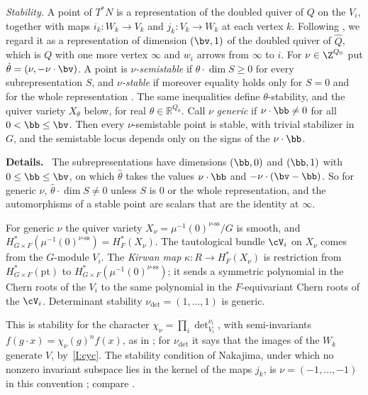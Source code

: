 \documentclass[11pt]{amsart}
\newenvironment{details}{\par\color{black!60!green}\noindent\textbf{Details.}\ }{\par}
\begin{document}
\emph{Stability.}  A point of $T^*N$ is a representation of the doubled
quiver of $Q$ on the $V_i$, together with maps $i_k\colon W_k\to V_k$ and
$j_k\colon V_k\to W_k$ at each vertex $k$.  Following \cite[\S1]{crawley-boeveyGeometryMoment2001}, we regard it as a
representation of dimension $(\bv,1)$ of the doubled quiver of $\hat Q$,
which is $Q$ with one more vertex $\infty$ and $w_i$ arrows from $\infty$ to
$i$.  For $\nu\in\Z^{Q_0}$ put $\hat\theta=(\nu,-\nu\cdot\bv)$.  A point is
\emph{$\nu$-semistable} if $\hat\theta\cdot\dim S\ge0$ for every
subrepresentation $S$, and \emph{$\nu$-stable} if moreover equality holds
only for $S=0$ and for the whole representation \cite{kingModuliRepresentations1994}.  The same
inequalities define $\theta$-stability, and the quiver variety $X_\theta$
below, for real $\theta\in\mathbb R^{Q_0}$.  Call $\nu$ \emph{generic} if
$\nu\cdot\bb\neq0$ for all $0<\bb\le\bv$.  Then every $\nu$-semistable point is
stable, with trivial stabilizer in $G$, and the semistable locus depends only
on the signs of the $\nu\cdot\bb$.
\begin{details}
The subrepresentations have dimensions $(\bb,0)$ and $(\bb,1)$ with
$0\le\bb\le\bv$, on which $\hat\theta$ takes the values $\nu\cdot\bb$ and
$-\nu\cdot(\bv-\bb)$.  So for generic $\nu$, $\hat\theta\cdot\dim S\neq0$ unless
$S$ is $0$ or the whole representation, and the automorphisms of a stable
point are scalars that are the identity at $\infty$.
\end{details}
For generic $\nu$ the quiver variety
$X_\nu=\mu^{-1}(0)^{\nu\text{-ss}}/G$ is smooth, and
$H^*_{G\times F}(\mu^{-1}(0)^{\nu\text{-ss}})=H^*_F(X_\nu)$.  The
tautological bundle $\cV_i$ on $X_\nu$ comes from the $G$-module $V_i$.  The
\emph{Kirwan map} $\kappa\colon R\to H^*_F(X_\nu)$ is restriction from
$H^*_{G\times F}(\mathrm{pt})$ to $H^*_{G\times F}(\mu^{-1}(0)^{\nu\text{-ss}})$; it
sends a symmetric polynomial in the Chern roots of the $V_i$ to the same
polynomial in the $F$-equivariant Chern roots of the $\cV_i$.  Determinant
stability $\nu_{\det}=(1,\dots,1)$ is generic.

This is stability for the character $\chi_\nu=\prod_i\det_{V_i}^{\nu_i}$, with
semi-invariants $f(g\cdot x)=\chi_\nu(g)^nf(x)$, as in
\cite[\S2.1]{hilburnBFNSpringer2023}; for $\nu_{\det}$ it says that the images of the $W_k$
generate $V$, by~\ref{I:cyc}.  The stability condition of Nakajima, under which no
nonzero invariant subspace lies in the kernel of the maps $j_k$, is
$\nu=(-1,\dots,-1)$ in this convention \cite[Lemma~3.8]{nakajimaQuiverVarieties1998}; compare
\cite[Rem.~7.12]{hilburnBFNSpringer2023}.
\end{document}
